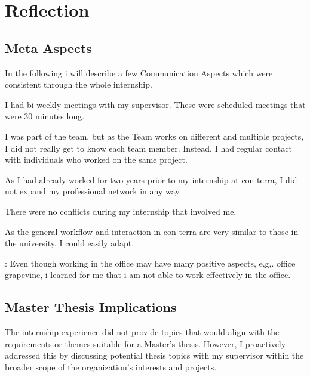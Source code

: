 \documentclass[11pt, titlepage, a4paper]{article}
\begin{document}
\section{Reflection}

\subsection{Meta Aspects}
In the following i will describe a few Communication Aspects which were consistent through the whole internship.
\begin{description}[]
    \item[Supervisor Communication:] I had bi-weekly meetings with my supervisor. These were scheduled meetings that were 30 minutes long.
    \item[Teamwork:] I was part of the team, but as the Team works on different and multiple projects, I did not really get to know each team member. Instead, I had regular contact with individuals who worked on the same project.
    \item[Professional Network:] As I had already worked for two years prior to my internship at con terra, I did not expand my professional network in any way.
    \item[Conflicts:] There were no conflicts during my internship that involved me.
    \item[Applied Communication Skills:]  As the general workflow and interaction in con terra are very similar to those in the university, I could easily adapt.
    \item[In-Office Work]: Even though working in the office may have many positive aspects, e,g,. office grapevine, i learned for me that i am not able to work effectively in the office.  
\end{description}

\subsection{Master Thesis Implications}
The internship experience did not provide topics that would align with the requirements or themes suitable for a Master's thesis. However, I proactively addressed this by discussing potential thesis topics with my supervisor within the broader scope of the organization's interests and projects.
\end{document}
